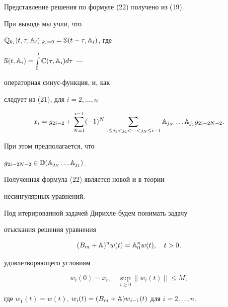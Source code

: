  


Представление решения по формуле (22) получено из (19).  


При выводе мы учли, что 


$\Bbb Q_{k_i}(t,\tau,\Bbb A_i)|_{k_i=0}=\Bbb S(t-\tau,\Bbb A_i)$, где 


$\Bbb S(t,\Bbb A_i)=\int\limits^t_0\Bbb C(\tau,\Bbb A_i)d\tau$ --- 


операторная синус-функция, и, как 


следует из (21), для $i=2,\dotsc,n$ 


$$ 


x_i=g_{2i-2}+\sum^{i-1}_{N=1}(-1)^N 


\sum_{1\le j_1<j_2<\dotsb<j_N\le i-1}\Bbb A_{j_N}\dotsc 


\Bbb A_{j_1}g_{2i-2N-2}. 


$$ 


При этом предполагается, что 


$g_{2i-2N-2}\in\Bbb D(\Bbb A_{j_N}\dotsc\Bbb A_{j_1})$. 


 


Полученная формула (22) является новой и в теории  


несингулярных уравнений.  


 


Под итерированной задачей Дирихле будем понимать задачу 


отыскания решения уравнения 


\begin{equation} 


(B_m+\Bbb A)^n w(t)=\Bbb A^n_0 w(t),\quad t>0, 


\end{equation} 


удовлетворяющего условиям 


\begin{equation} 


w_i(0)=x_i,\quad \sup_{t\ge 0}\|w_i(t)\|\le M, 


\end{equation} 


где $w_1(t)=w(t)$, $w_i(t)=(B_m+\Bbb A)w_{i-1}(t)$ для $i=2,\dotsc,n$. 


 


